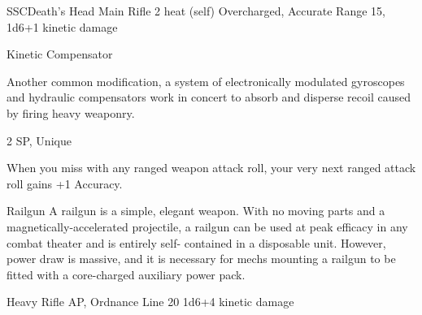 \begin{mech}{SSC}{Death's Head}
Main Rifle
2 heat (self)
Overcharged, Accurate
Range 15, 1d6+1 kinetic damage


Kinetic Compensator

Another common modification, a system of electronically modulated gyroscopes and hydraulic compensators work in concert to absorb and disperse recoil caused by firing heavy weaponry.

2 SP, Unique

When you miss with any ranged weapon attack roll, your very next ranged attack roll gains +1 Accuracy.


Railgun
A railgun is a simple, elegant weapon. With no moving parts and a magnetically-accelerated projectile, a railgun can be used at peak efficacy in any combat theater and is entirely self- contained in a disposable unit. However, power draw is massive, and it is necessary for mechs mounting a railgun to be fitted with a core-charged auxiliary power pack.

Heavy Rifle
AP, Ordnance
Line 20
1d6+4 kinetic damage

\end{mech}
